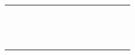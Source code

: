 \documentclass[11pt, a4paper]{article}
\newcommand{\cmark}{\textcolor{green!55!black}{\ding{51}}}
\newcommand{\xmark}{\textcolor{red!60!black}{\ding{55}}}
\begin{document}
\begin{table}[!htb]
{\begin{tabular}{@{}l*{14}{c}@{}}
\citet{Nohkim2019} & \xmark & \xmark & \xmark & \xmark & \cmark & \cmark & \xmark & \xmark & \xmark & \xmark & \cmark & \cmark & \xmark & \xmark \\
\citet{Zhen2019} & \xmark & \xmark & \xmark & \xmark & \xmark & \cmark & \xmark & \xmark & \xmark & \xmark & \cmark & \xmark & \xmark & \xmark \\
\citet{mardan2019accelerated} & \xmark & \xmark & \xmark & \cmark & \cmark & \xmark & \xmark & \xmark & \xmark & \xmark & \cmark & \xmark & \xmark & \xmark \\
\citet{Yavari2019} & \xmark & \xmark & \xmark & \xmark & \cmark & \cmark & \cmark & \xmark & \xmark & \xmark & \cmark & \xmark & \xmark & \xmark \\
\citet{De2020} & \xmark & \cmark & \xmark & \xmark & \xmark & \xmark & \xmark & \xmark & \xmark & \xmark & \cmark & \xmark & \xmark & \xmark \\
\citet{Zabarkhshnia2020} & \xmark & \xmark & \xmark & \xmark & \xmark & \xmark & \xmark & \xmark & \xmark & \xmark & \cmark & \xmark & \xmark & \cmark \\
\citet{Parast2021} & \xmark & \xmark & \xmark & \xmark & \cmark & \cmark & \cmark & \xmark & \xmark & \xmark & \cmark & \xmark & \xmark & \xmark \\
\citet{Sadeghi2021} & \xmark & \xmark & \xmark & \xmark & \cmark & \cmark & \cmark & \xmark & \xmark & \xmark & \cmark & \xmark & \xmark & \xmark \\
\citet{Gholizadeh2022} & \xmark & \xmark & \xmark & \xmark & \cmark & \cmark & \xmark & \xmark & \xmark & \xmark & \cmark & \cmark & \xmark & \xmark \\
\citet{chen2022reverse} & \cmark & \xmark & \xmark & \xmark & \xmark & \xmark & \cmark & \cmark & \xmark & \xmark & \xmark & \xmark & \xmark & \xmark \\
\citet{tarin2024mixed} & \xmark & \xmark & \xmark & \cmark & \cmark & \xmark & \xmark & \xmark & \xmark & \xmark & \xmark & \xmark & \xmark & \xmark \\
\citet{fani2025sustainable} & \xmark & \xmark & \xmark & \cmark & \xmark & \cmark & \xmark & \xmark & \xmark & \xmark & \cmark & \xmark & \xmark & \xmark \\
\citet{halder2025multi} & \xmark & \xmark & \xmark & \cmark & \xmark & \xmark & \xmark & \xmark & \xmark & \xmark & \cmark & \xmark & \cmark & \cmark \\
\citet{luo2025two} & \xmark & \xmark & \xmark & \xmark & \xmark & \xmark & \cmark & \cmark & \xmark & \xmark & \xmark & \xmark & \xmark & \xmark \\

\end{tabular}}
\end{table}
\end{document}
